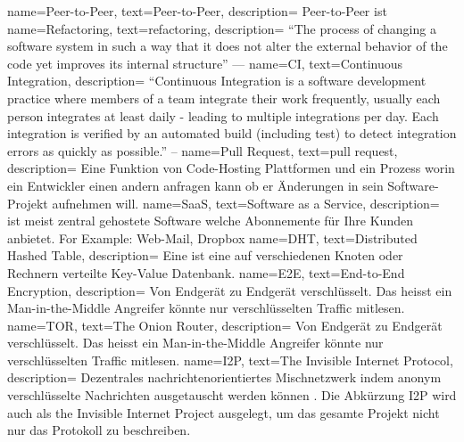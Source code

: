 \makeglossaries
                 { name={Peer-to-Peer},                  text={Peer-to-Peer},           description={{
    Peer-to-Peer ist
}}}
         { name={Refactoring},                   text={refactoring},            description={{
    ``The process of changing a software system in such a way that it does
        not alter the external behavior of the code yet improves its internal
        structure'' ---\cite{fowler_refactoring_2018}
}}}
                  { name={CI},        text={Continuous Integration}, description={{
    ``Continuous Integration is a software development practice where members
    of a team integrate their work frequently,                                 usually each person integrates
    at least daily - leading to multiple integrations per day. Each integration
    is verified by an automated build (including test) to detect integration
    errors as quickly as possible.'' -- \cite{fowler_continuos_2014}
}}}
                  { name={Pull Request},                  text={pull request},           description={{
    Eine Funktion von Code-Hosting Plattformen und ein Prozess worin ein Entwickler einen andern anfragen kann ob er Änderungen in sein Software-Projekt aufnehmen will.
}}}
                { name={SaaS},                          text={Software as a Service},  description={{
             ist meist zentral gehostete Software welche Abonnemente für Ihre Kunden anbietet.
    For Example: Web-Mail, Dropbox
}}}
                 { name={DHT},        text={Distributed Hashed Table},                    description={{
    Eine  ist eine auf verschiedenen Knoten oder Rechnern verteilte Key-Value Datenbank.
}}}
                 { name={E2E},        text={End-to-End Encryption},                     description={{
    Von Endgerät zu Endgerät verschlüsselt. Das heisst ein Man-in-the-Middle Angreifer könnte nur verschlüsselten Traffic mitlesen.
}}}
                 { name={TOR},        text={The Onion Router},                          description={{
    Von Endgerät zu Endgerät verschlüsselt. Das heisst ein Man-in-the-Middle Angreifer könnte nur verschlüsselten Traffic mitlesen.
}}}
                 { name={I2P},        text={The Invisible Internet Protocol},                          description={{
            Dezentrales nachrichtenorientiertes Mischnetzwerk indem anonym verschlüsselte Nachrichten ausgetauscht werden können \parencite[p.~1]{zantout_i2p_2011}. Die Abkürzung I2P wird auch als the Invisible Internet Project ausgelegt, um das gesamte Projekt nicht nur das Protokoll zu beschreiben.
}}}

